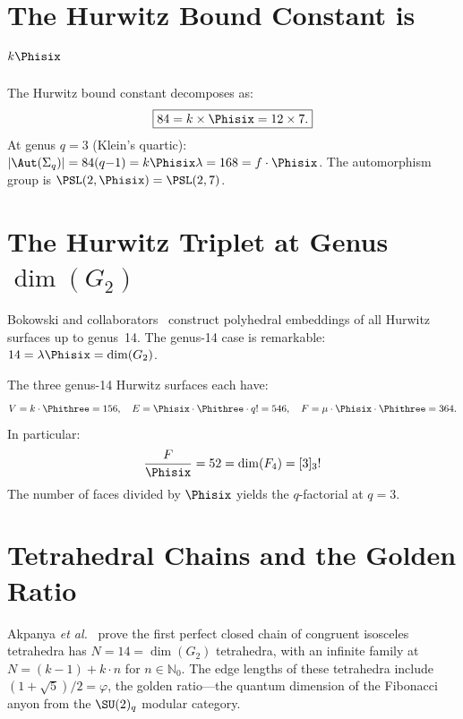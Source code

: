\section{\texorpdfstring{The Hurwitz Bound Constant is $k\Phisix$}{The Hurwitz Bound Constant is k Phi6}}
\label{sec:hurwitz-bound}

\begin{theorem}
The Hurwitz bound constant decomposes as:
\begin{equation}
\boxed{84 = k\times\Phisix = 12\times 7.}
\end{equation}
At genus $q=3$ (Klein's quartic):
$|\Aut(\Sigma_q)| = 84(q{-}1) = k\Phisix\lambda = 168 = f\cdot\Phisix$.
The automorphism group is $\PSL(2,\Phisix)=\PSL(2,7)$.
\end{theorem}


\section{\texorpdfstring{The Hurwitz Triplet at Genus $\dim(G_2)$}{The Hurwitz Triplet at Genus dim(G2)}}
\label{sec:hurwitz-triplet}

Bokowski and collaborators~\cite{Bokowski2025} construct polyhedral
embeddings of all Hurwitz surfaces up to genus~14.
The genus-14 case is remarkable: $14 = \lambda\Phisix = \dim(G_2)$.

\begin{theorem}
The three genus-14 Hurwitz surfaces each have:
\begin{equation}
V = k\cdot\Phithree = 156, \quad
E = \Phisix\cdot\Phithree\cdot q! = 546, \quad
F = \mu\cdot\Phisix\cdot\Phithree = 364.
\end{equation}
In particular:
\begin{equation}
\frac{F}{\Phisix} = 52 = \dim(F_4) = [3]_3!
\end{equation}
The number of faces divided by $\Phisix$ yields the $q$-factorial at $q=3$.
\end{theorem}


\section{Tetrahedral Chains and the Golden Ratio}
\label{sec:tet-chains}

Akpanya \emph{et al.}~\cite{Akpanya2026} prove the first perfect
closed chain of congruent isosceles tetrahedra has
$N = 14 = \dim(G_2)$ tetrahedra, with an infinite family at
$N = (k{-}1) + k\cdot n$ for $n\in\mathbb{N}_0$.
The edge lengths of these tetrahedra include
$(1+\sqrt{5})/2 = \varphi$, the golden ratio---the quantum
dimension of the Fibonacci anyon from the $\SU(2)_q$ modular category.



